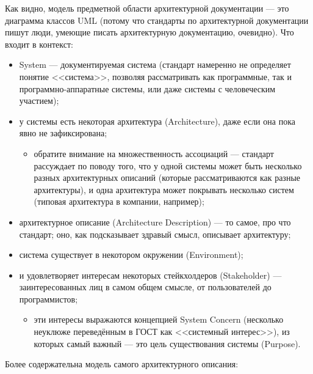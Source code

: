 \documentclass{../mcstext}
\begin{document}
Как видно, модель предметной области архитектурной документации --- это диаграмма классов UML (потому что стандарты по архитектурной документации пишут люди, умеющие писать архитектурную документацию, очевидно). Что входит в контекст:

\begin{itemize}
    \item System --- документируемая система (стандарт намеренно не определяет понятие <<система>>, позволяя рассматривать как программные, так и программно-аппаратные системы, или даже системы с человеческим участием);
    \item у системы есть некоторая архитектура (Architecture), даже если она пока явно не зафиксирована;
    \begin{itemize}
        \item обратите внимание на множественность ассоциаций --- стандарт рассуждает по поводу того, что у одной системы может быть несколько разных архитектурных описаний (которые рассматриваются как разные архитектуры), и одна архитектура может покрывать несколько систем (типовая архитектура в компании, например);
    \end{itemize}
    \item архитектурное описание (Architecture Description) --- то самое, про что стандарт; оно, как подсказывает здравый смысл, описывает архитектуру;
    \item система существует в некотором окружении (Environment);
    \item и удовлетворяет интересам некоторых стейкхолдеров (Stakeholder) --- заинтересованных лиц в самом общем смысле, от пользователей до программистов;
    \begin{itemize}
        \item эти интересы выражаются концепцией System Concern (несколько неуклюже переведённым в ГОСТ как <<системный интерес>>), из которых самый важный --- это цель существования системы (Purpose).
    \end{itemize}
\end{itemize}

Более содержательна модель самого архитектурного описания:
\end{document}
